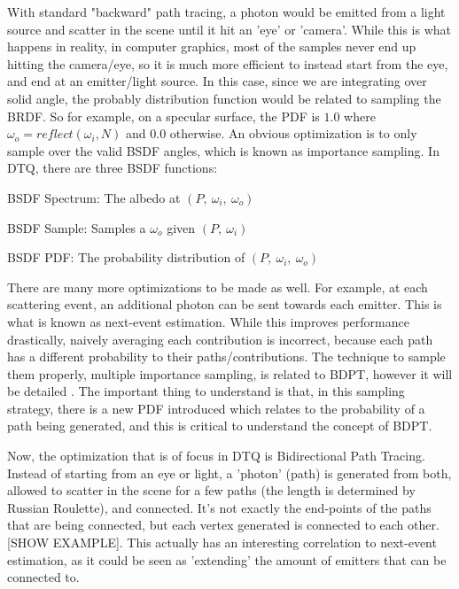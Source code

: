 \message{ !name(test.tex)}\documentclass{article}
\begin{document}
  With standard "backward" path tracing, a photon would be emitted from a light
source and scatter in the scene until it hit an 'eye' or 'camera'. While this is
what happens in reality, in computer graphics, most of the samples never end up
hitting the camera/eye, so it is much more efficient to instead start from the
eye, and end at an emitter/light source. In this case, since we are integrating
over solid angle, the probably distribution function would be related to
sampling the BRDF. So for example, on a specular surface, the PDF is $1.0$ where
$\omega_o = reflect(\omega_i, N)$ and $0.0$ otherwise. An obvious optimization
is to only sample over the valid BSDF angles, which is known as importance
sampling. In DTQ, there are three BSDF functions:
  
  \begin{list}{}{}
  \item BSDF Spectrum: The albedo at $(P,\:\omega_i,\:\omega_o)$
  \item BSDF Sample: Samples a $\omega_o$ given $(P,\:\omega_i)$
  \item BSDF PDF: The probability distribution of $(P,\:\omega_i,\:\omega_o)$
  \end{list}
  
  There are many more optimizations to be made as well. For example, at each
scattering event, an additional photon can be sent towards each emitter. This is
what is known as next-event estimation. While this improves performance
drastically, naively averaging each contribution is incorrect, because each path
has a different probability to their paths/contributions. The technique to
sample them properly, multiple importance sampling, is related to BDPT, however
it will be detailed . The important thing to understand is that, in this
sampling strategy, there is a new PDF introduced which relates to the
probability of a path being generated, and this is critical to understand the
concept of BDPT.
  
  Now, the optimization that is of focus in DTQ is Bidirectional Path Tracing.
Instead of starting from an eye or light, a 'photon' (path) is generated from
both, allowed to scatter in the scene for a few paths (the length is determined
by Russian Roulette), and connected. It's not exactly the end-points of the
paths that are being connected, but each vertex generated is connected to each
other. [SHOW EXAMPLE]. This actually has an interesting correlation to
next-event estimation, as it could be seen as 'extending' the amount of emitters
that can be connected to.
  
\end{document}
